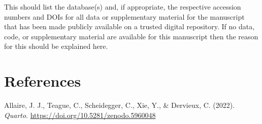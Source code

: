 \documentclass[
]{article}
\newlength{\cslhangindent}
\newlength{\cslentryspacingunit} %
\newenvironment{CSLReferences}[2] %
 {%
  \setlength{\parindent}{0pt}
  \ifodd #1
  \let\oldpar\par
  \def\par{\hangindent=\cslhangindent\oldpar}
  \fi
  \setlength{\parskip}{#2\cslentryspacingunit}
 }%
 {}
\begin{document}
This should list the database(s) and, if appropriate, the respective
accession numbers and DOIs for all data or supplementary material for
the manuscript that has been made publicly available on a trusted
digital repository. If no data, code, or supplementary material are
available for this manuscript then the reason for this should be
explained here.

\hypertarget{bibliography}{%
\section*{References}\label{bibliography}}

\hypertarget{refs}{}
\begin{CSLReferences}{1}{0}
\leavevmode{}%
Allaire, J. J., Teague, C., Scheidegger, C., Xie, Y., \& Dervieux, C.
(2022). \emph{Quarto}. \url{https://doi.org/10.5281/zenodo.5960048}

\end{CSLReferences}
\end{document}

